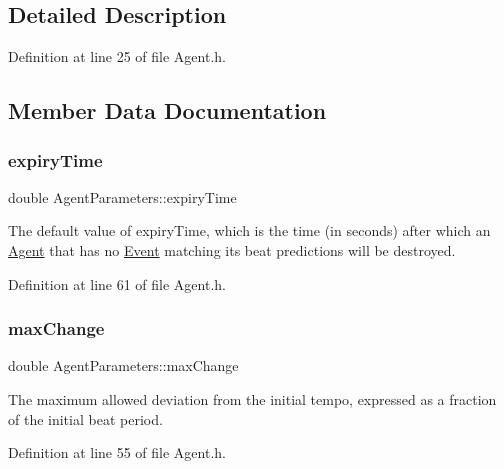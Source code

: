 \subsection{Detailed Description}


Definition at line 25 of file Agent.\+h.



\subsection{Member Data Documentation}
\mbox{\label{class_agent_parameters_a167dbdb2f25f7b6f2ec4af9cfa74a44c}} 
\subsubsection{\texorpdfstring{expiry\+Time}{expiryTime}}
{\footnotesize\ttfamily double Agent\+Parameters\+::expiry\+Time}

The default value of expiry\+Time, which is the time (in seconds) after which an \hyperlink{class_agent}{Agent} that has no \hyperlink{struct_event}{Event} matching its beat predictions will be destroyed. 

Definition at line 61 of file Agent.\+h.

\mbox{\label{class_agent_parameters_ae50401dd1e8605b30208b6b56a498569}} 
\subsubsection{\texorpdfstring{max\+Change}{maxChange}}
{\footnotesize\ttfamily double Agent\+Parameters\+::max\+Change}

The maximum allowed deviation from the initial tempo, expressed as a fraction of the initial beat period. 

Definition at line 55 of file Agent.\+h.

\mbox{\label{class_agent_parameters_a40865ba74e32db1392f35aa1ee27e0fb}} 
